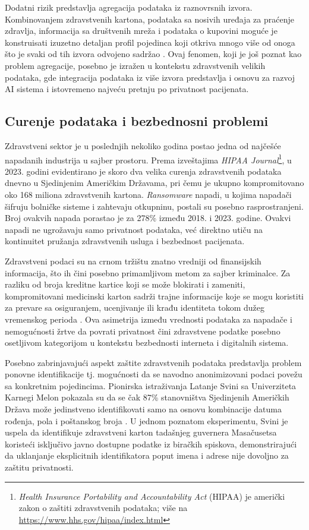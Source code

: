 \documentclass[12pt]{article}
\begin{document}
Dodatni rizik predstavlja agregacija podataka iz raznovrsnih izvora. Kombinovanjem zdravstvenih kartona, podataka sa nosivih uređaja za praćenje zdravlja, informacija sa društvenih mreža i podataka o kupovini moguće je konstruisati izuzetno detaljan profil pojedinca koji otkriva mnogo više od onoga što je svaki od tih izvora odvojeno sadržao 
\cite{abouelmehdi2017}. Ovaj fenomen, koji je još poznat kao problem agregacije, posebno je izražen u kontekstu zdravstvenih velikih podataka, gde integracija podataka iz više izvora predstavlja i osnovu za razvoj AI sistema i istovremeno najveću pretnju po privatnost pacijenata.
 
\subsection{Curenje podataka i bezbednosni problemi}
Zdravstveni sektor je u poslednjih nekoliko godina postao jedna od najčešće napadanih industrija u sajber prostoru. Prema izveštajima \textit{HIPAA Journal}\footnote{\textit{Health Insurance Portability and Accountability Act} (HIPAA) je američki zakon o zaštiti zdravstvenih podataka; više na \url{https://www.hhs.gov/hipaa/index.html}}, u 2023. godini evidentirano je skoro dva velika curenja zdravstvenih podataka dnevno u Sjedinjenim Američkim Državama, pri čemu je ukupno kompromitovano oko 168 miliona zdravstvenih kartona. \textit{Ransomware} napadi, u kojima napadači šifruju bolničke sisteme i zahtevaju otkupninu, postali su posebno rasprostranjeni. Broj ovakvih napada porastao je za 278\% između 2018. i 2023. godine. Ovakvi napadi ne ugrožavaju samo privatnost podataka, već direktno utiču na kontinuitet pružanja zdravstvenih usluga i bezbednost pacijenata.
 
Zdravstveni podaci su na crnom tržištu znatno vredniji od finansijskih informacija, što ih čini posebno primamljivom metom za sajber kriminalce. Za razliku od broja kreditne kartice koji se može blokirati i zameniti, kompromitovani medicinski karton sadrži trajne informacije koje se mogu koristiti za prevare sa osiguranjem, ucenjivanje ili krađu identiteta tokom dužeg vremenskog perioda \cite{abouelmehdi2017}. 
Ova asimetrija između vrednosti podataka za napadače i nemogućnosti žrtve da povrati privatnost čini zdravstvene podatke posebno osetljivom kategorijom u kontekstu bezbednosti interneta i digitalnih sistema.
 
Posebno zabrinjavajući aspekt zaštite zdravstvenih podataka predstavlja problem ponovne identifikacije tj. mogućnosti da se navodno anonimizovani podaci povežu sa konkretnim pojedincima. Pionirska istraživanja Latanje Svini sa Univerziteta Karnegi Melon pokazala su da se čak 87\% stanovništva Sjedinjenih Američkih Država može jedinstveno identifikovati samo na osnovu kombinacije datuma rođenja, pola i poštanskog broja \cite{sweeney2000}. U jednom poznatom eksperimentu, Svini je 
uspela da identifikuje zdravstveni karton tadašnjeg guvernera Masačusetsa koristeći isključivo javno dostupne podatke iz biračkih spiskova, demonstrirajući da uklanjanje eksplicitnih identifikatora poput imena i adrese nije dovoljno za zaštitu privatnosti.
 
\end{document}

